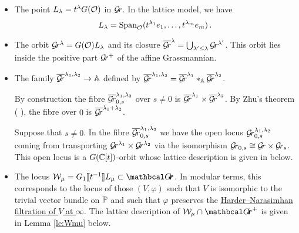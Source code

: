 \documentclass[draft]{article}
\begin{document}
% 
\begin{itemize}
    \item The point $L_\lambda = t^\lambda G(\mathcal O)$ in $\mathcal{G}\!r$. In the lattice model, we have
    $$ 
    L_\lambda = \operatorname{Span}_\mathcal O(t^{\lambda_1}e_1, \dots, t^{\lambda_m}e_m)\,. 
    $$
    \item The orbit $\mathcal{G}\!r^\lambda = G(\mathcal O) L_\lambda$ and its closure 
    $ \overline{\mathcal{G}\!r}^\lambda = \bigcup_{\lambda' \le \lambda} \mathcal{G}\!r^{\lambda'} $.  
     
    This orbit lies inside the positive part $ \mathcal{G}\!r^+$ of the affine Grassmannian.
    \item The family $ \overline{\mathcal{G}\!r}^{\lambda_1, \lambda_2} \rightarrow \mathbb A$ defined by $ \overline{\mathcal{G}\!r}^{\lambda_1, \lambda_2} = \overline{\mathcal{G}\!r}^{\lambda_1} \ast_\mathbb A \overline{\mathcal{G}\!r}^{\lambda_2}$. 
    
    By construction the fibre $ \overline{\mathcal{G}\!r}_{0,s}^{\lambda_1, \lambda_2} $ over $ s \ne 0 $ is $ \overline{\mathcal{G}\!r}^{\lambda_1} \times \overline{\mathcal{G}\!r}^{\lambda_2}$.  By Zhu's theorem ( ), the fibre over $ 0 $ is $ \overline{\mathcal{G}\!r}^{\lambda_1 + \lambda_2}$.
    
    Suppose that $ s \ne 0$.  In the fibre $\overline{\mathcal{G}\!r}_{0,s}^{\lambda_1, \lambda_2}$ we have the open locus $ \mathcal{G}\!r_{0,s}^{\lambda_1, \lambda_2}$ coming from transporting $ \mathcal{G}\!r^{\lambda_1} \times \mathcal{G}\!r^{\lambda_2} $ via the isomorphism $ \mathcal{G}\!r_{0,s} \cong \mathcal{G}\!r \times \mathcal{G}\!r_s $.  This open locus is a $ G(\mathbb C[t])$-orbit
    whose lattice description is given in  below.
    
    \item The locus $\cW_\mu = G_1\xt[t^{-1}]L_\mu \subset \Grth $.  
    In modular terms, this corresponds to the locus of those $ (V, \varphi)$ such that $ V $ is isomorphic to the trivial vector bundle on $ \mathbb P$ and such that $ \varphi$ preserves the \ul{Harder--Narasimhan filtration of $V$ at $ \infty$}.  The lattice description of $ \cW_\mu \cap \Grth^+$ is given in Lemma \ref{le:Wmu} below. 
    

\end{itemize}
\end{document}
